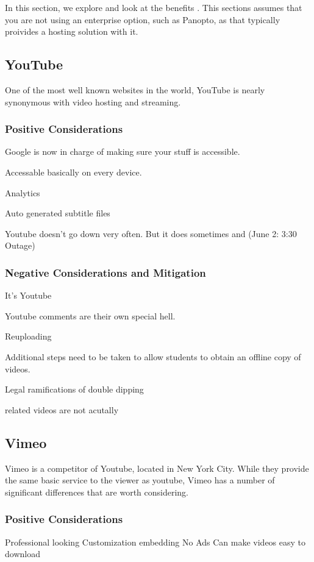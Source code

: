 \documentclass[sigconf]{acmart}
\begin{document}
In this section, we explore and look at the benefits .  This sections assumes that you are not using an enterprise option, such as Panopto, as that typically proivides a hosting solution with it.

\subsection{YouTube}
One of the most well known websites in the world, YouTube is nearly synonymous with video hosting and streaming.


\subsubsection{Positive Considerations}
Google is now in charge of making sure your stuff is accessible.


Accessable basically on every device.

Analytics


Auto generated subtitle files

Youtube doesn't go down very often.  But it does sometimes \cite{outage2018} and (June 2: 3:30 Outage) \cite{outage2019}

\subsubsection{Negative Considerations and Mitigation}

It's Youtube

Youtube comments are their own special hell.


Reuploading

Additional steps need to be taken to allow students to obtain an offline copy of videos.

Legal ramifications of double dipping

related videos are not acutally 

\subsection{Vimeo}
Vimeo is a competitor of Youtube, located in New York City.
While they provide the same basic service to the viewer as youtube, Vimeo has a number of significant differences that are worth considering.

\subsubsection{Positive Considerations}
Professional looking
Customization embedding
No Ads
Can make videos easy to download
\end{document}
